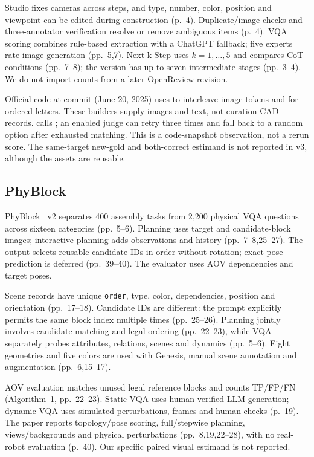 \documentclass[10pt,letterpaper]{article}
\begin{document}
Studio fixes cameras across steps, and type, number, color, position
and viewpoint can be edited during construction (p.~4).
Duplicate/image checks and three-annotator verification resolve or
remove ambiguous items (p.~4). VQA scoring combines rule-based
extraction with a ChatGPT fallback; five experts rate image generation
(pp.~5,7). Next-k-Step uses $k=1,\ldots,5$ and compares CoT conditions
(pp.~7--8); the version has up to seven intermediate stages (pp.~3--4).
We do not import counts from a later OpenReview revision.

Official code at commit
 (June 20, 2025)
uses  to interleave image tokens and
 for ordered letters.
These builders supply images and text, not curation CAD records.
 calls ;
an enabled judge can retry three times and fall back to a random
option after exhausted matching. This is a code-snapshot observation,
not a rerun score. The same-target new-gold and both-correct estimand is
not reported in v3, although the assets are reusable.

\subsection{PhyBlock}
PhyBlock~\cite{ma2025phyblock} v2 separates 400 assembly tasks from
2,200 physical VQA questions across sixteen categories (pp.~5--6).
Planning uses target and candidate-block images; interactive planning
adds observations and history (pp.~7--8,25--27).
The output selects reusable candidate IDs in order without rotation;
exact pose prediction is deferred (pp.~39--40).
The evaluator uses AOV dependencies and target poses.

Scene records have unique \texttt{order}, type, color, dependencies,
position and orientation (pp.~17--18). Candidate IDs are different:
the prompt explicitly permits the same block index multiple times
(pp.~25--26). Planning jointly involves candidate matching and legal
ordering (pp.~22--23), while VQA separately probes attributes,
relations, scenes and dynamics (pp.~5--6).
Eight geometries and five colors are used with Genesis, manual scene
annotation and augmentation (pp.~6,15--17).

AOV evaluation matches unused legal reference blocks and counts
TP/FP/FN (Algorithm~1, pp.~22--23). Static VQA uses human-verified
LLM generation; dynamic VQA uses simulated perturbations, frames and
human checks (p.~19). The paper reports topology/pose scoring,
full/stepwise planning, views/backgrounds and physical perturbations
(pp.~8,19,22--28), with no real-robot evaluation (p.~40).
Our specific paired visual estimand is not reported.
\end{document}
